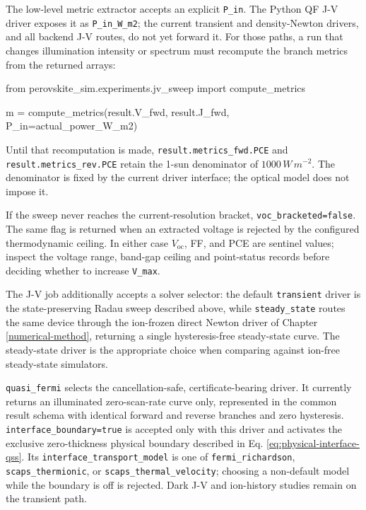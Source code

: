 \documentclass[
  11pt,
  american,
]{report}
\newenvironment{Shaded}{}{}
\newcommand{\ImportTok}[1]{#1}
\newcommand{\NormalTok}[1]{#1}
\newcommand{\OperatorTok}[1]{\textcolor[rgb]{0.40,0.40,0.40}{#1}}
\begin{document}
The low-level metric extractor accepts an explicit \texttt{P\_in}. The
Python QF J-V driver exposes it as \texttt{P\_in\_W\_m2}; the current
transient and density-Newton drivers, and all backend J-V routes, do not
yet forward it. For those paths, a run that changes illumination
intensity or spectrum must recompute the branch metrics from the
returned arrays:

\begin{Shaded}
\begin{Highlighting}[]
\ImportTok{from}\NormalTok{ perovskite\_sim.experiments.jv\_sweep }\ImportTok{import}\NormalTok{ compute\_metrics}

\NormalTok{m }\OperatorTok{=}\NormalTok{ compute\_metrics(result.V\_fwd, result.J\_fwd, P\_in}\OperatorTok{=}\NormalTok{actual\_power\_W\_m2)}
\end{Highlighting}
\end{Shaded}

Until that recomputation is made, \texttt{result.metrics\_fwd.PCE} and
\texttt{result.metrics\_rev.PCE} retain the 1-sun denominator of
\(1000\,W\,m^{-2}\). The denominator is fixed by the current driver
interface; the optical model does not impose it.

If the sweep never reaches the current-resolution bracket,
\texttt{voc\_bracketed=false}. The same flag is returned when an
extracted voltage is rejected by the configured thermodynamic ceiling.
In either case \(V_\mathrm{oc}\), FF, and PCE are sentinel values;
inspect the voltage range, band-gap ceiling and point-status records
before deciding whether to increase \texttt{V\_max}.

The J-V job additionally accepts a solver selector: the default
\texttt{transient} driver is the state-preserving Radau sweep described
above, while \texttt{steady\_state} routes the same device through the
ion-frozen direct Newton driver of Chapter \ref{numerical-method},
returning a single hysteresis-free steady-state curve. The steady-state
driver is the appropriate choice when comparing against ion-free
steady-state simulators.

\texttt{quasi\_fermi} selects the cancellation-safe, certificate-bearing
driver. It currently returns an illuminated zero-scan-rate curve only,
represented in the common result schema with identical forward and
reverse branches and zero hysteresis. \texttt{interface\_boundary=true}
is accepted only with this driver and activates the exclusive
zero-thickness physical boundary described in Eq.
\ref{eq:physical-interface-qss}. Its
\texttt{interface\_transport\_model} is one of
\texttt{fermi\_richardson}, \texttt{scaps\_thermionic}, or
\texttt{scaps\_thermal\_velocity}; choosing a non-default model while
the boundary is off is rejected. Dark J-V and ion-history studies remain
on the transient path.
\end{document}
